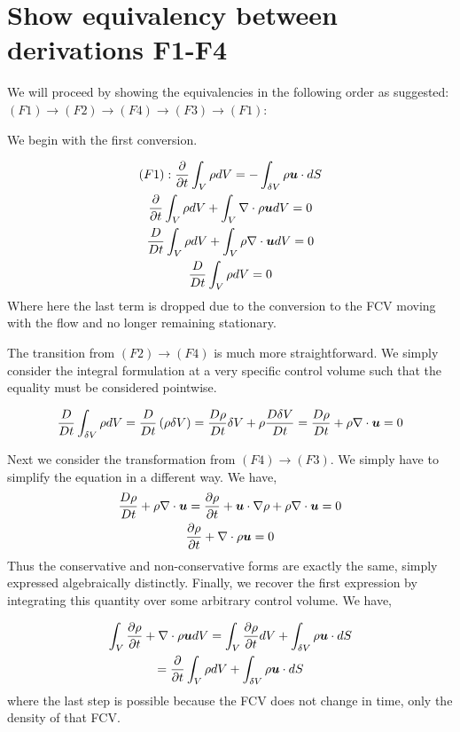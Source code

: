 \documentclass{article}
\begin{document}
\section{Show equivalency between derivations F1-F4}

We will proceed by showing the equivalencies in the following order as
suggested: $(F1) \to (F2) \to (F4) \to (F3) \to (F1)$:

We begin with the first conversion. 

\begin{gather*}
    (F1): \frac{\partial }{\partial t}\int_V \rho dV = - \int_{\delta V} \rho \boldsymbol{u} \cdot dS\\
    \frac{\partial }{\partial t}\int_V \rho dV + \int_{V} \nabla\cdot \rho \boldsymbol{u} dV = 0\\
    \frac{D }{D t}\int_V \rho dV + \int_V \rho \nabla\cdot\boldsymbol{u} dV =0\\
    \frac{D }{D t}\int_V \rho dV = 0
\end{gather*}
Where here the last term is dropped due to the conversion to the FCV moving with
the flow and no longer remaining stationary. 

The transition from $(F2) \to (F4)$ is much more straightforward. We simply
consider the integral formulation at a very specific control volume such that
the equality must be considered pointwise. 

\begin{gather*}
    \frac{D }{D t}\int_{\delta V} \rho dV = \frac{D }{D t}\left(\rho \delta V\right ) =
    \frac{D \rho}{D t} \delta V + \rho \frac{D \delta V}{D t} = \frac{D \rho}{D t} + \rho \nabla \cdot{\boldsymbol{u}} =
    0
\end{gather*}

Next we consider the transformation from $(F4) \to (F3)$. We simply have to
simplify the equation in a different way. We have, 
\begin{gather*}
    \frac{D \rho}{D t} + \rho \nabla \cdot{\boldsymbol{u}} =  \frac{\partial \rho}{\partial t} + \boldsymbol{u}\cdot\nabla\rho +
    \rho\nabla \cdot{\boldsymbol{u}} = 0\\
    \frac{\partial \rho}{\partial t} + \nabla \cdot{\rho\boldsymbol{u}} = 0 
\end{gather*}
Thus the conservative and non-conservative forms are exactly the same, simply
expressed algebraically distinctly. Finally, we recover the first expression by
integrating this quantity over some arbitrary control volume. We have, 

\begin{gather*}
    \int_V \frac{\partial \rho}{\partial t} + \nabla \cdot{\rho\boldsymbol{u}} dV = \int_V \frac{\partial \rho}{\partial t} dV + \int_{\delta
    V}\rho \boldsymbol{u} \cdot dS\\
    = \frac{\partial }{\partial t}\int_V \rho dV + \int_{\delta
    V}\rho \boldsymbol{u} \cdot dS
\end{gather*}
where the last step is possible because the FCV does not change in time, only
the density of that FCV. 
\end{document}

